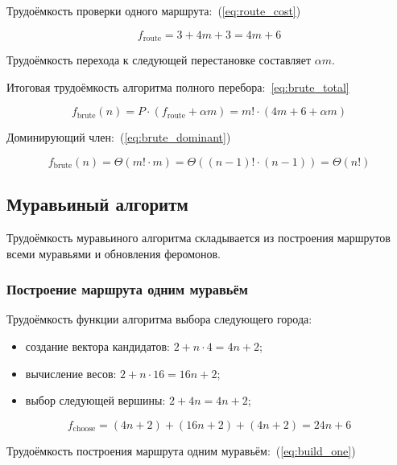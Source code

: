 Трудоёмкость проверки одного маршрута:~(\ref{eq:route_cost})

\begin{equation}
	\label{eq:route_cost}
	f_{\text{route}} = 3 + 4m + 3 = 4m + 6
\end{equation}

Трудоёмкость перехода к следующей перестановке составляет $\alpha m$.

Итоговая трудоёмкость алгоритма полного перебора:~\ref{eq:brute_total}

\begin{equation}
	\label{eq:brute_total}
	f_{\text{brute}}(n) = P \cdot (f_{\text{route}} + \alpha m) = m! \cdot (4m + 6 + \alpha m)
\end{equation}

Доминирующий член:~(\ref{eq:brute_dominant})

\begin{equation}
	\label{eq:brute_dominant}
	f_{\text{brute}}(n) = \Theta(m! \cdot m) = \Theta((n-1)! \cdot (n-1)) = \Theta(n!)
\end{equation}

\subsection{Муравьиный алгоритм}

Трудоёмкость муравьиного алгоритма складывается из построения маршрутов всеми муравьями и обновления феромонов.

\subsubsection{Построение маршрута одним муравьём}

Трудоёмкость функции алгоритма выбора следующего города:

\begin{itemize}
	\item создание вектора кандидатов: $2 + n \cdot 4 = 4n + 2$;
	\item вычисление весов: $2 + n \cdot 16 = 16n + 2$;
	\item выбор следующей вершины: $2 + 4n = 4n + 2$;
\end{itemize}

\begin{equation}
	\label{eq:choose_cost}
	f_{\text{choose}} = (4n + 2) + (16n + 2) + (4n + 2) = 24n + 6
\end{equation}

Трудоёмкость построения маршрута одним муравьём:~(\ref{eq:build_one})

